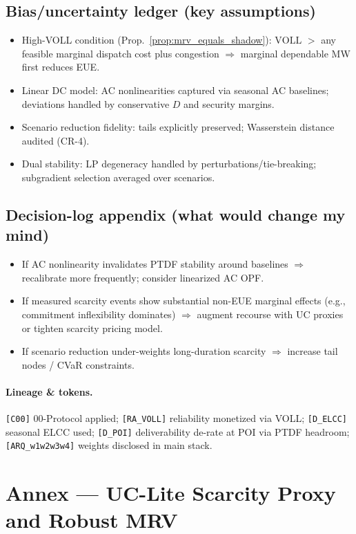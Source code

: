\documentclass[11pt]{article}
\numberwithin{equation}{section}
\theoremstyle{definition}
\theoremstyle{remark}
\begin{document}
\subsection{ Bias/uncertainty ledger (key assumptions)}
\begin{itemize}[leftmargin=1.2em,itemsep=0.25em]
  \item High-VOLL condition (Prop.~\ref{prop:mrv_equals_shadow}): $\mathrm{VOLL}$ $>$ any feasible marginal dispatch cost plus congestion $\Rightarrow$ marginal dependable MW first reduces EUE.
  \item Linear DC model: AC nonlinearities captured via seasonal AC baselines; deviations handled by conservative $D$ and security margins.
  \item Scenario reduction fidelity: tails explicitly preserved; Wasserstein distance audited (CR-4).
  \item Dual stability: LP degeneracy handled by perturbations/tie-breaking; subgradient selection averaged over scenarios.
\end{itemize}

\subsection{ Decision-log appendix (what would change my mind)}
\begin{itemize}[leftmargin=1.2em,itemsep=0.25em]
  \item If AC nonlinearity invalidates PTDF stability around baselines $\Rightarrow$ recalibrate more frequently; consider linearized AC OPF.
  \item If measured scarcity events show substantial non-EUE marginal effects (e.g., commitment inflexibility dominates) $\Rightarrow$ augment recourse with UC proxies or tighten scarcity pricing model.
  \item If scenario reduction under-weights long-duration scarcity $\Rightarrow$ increase tail nodes / CVaR constraints.
\end{itemize}

\paragraph{Lineage \& tokens.}
\texttt{[C00]} 00-Protocol applied; \texttt{[RA\_VOLL]} reliability monetized via VOLL; \texttt{[D\_ELCC]} seasonal ELCC used; \texttt{[D\_POI]} deliverability de-rate at POI via PTDF headroom; \texttt{[ARQ\_w1w2w3w4]} weights disclosed in main stack.

\section{Annex — UC-Lite Scarcity Proxy and Robust MRV}
\label{annex:H}
\end{document}
